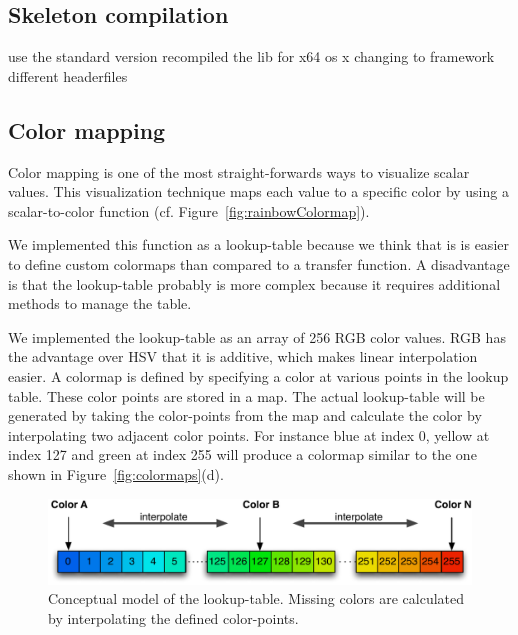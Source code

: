 \subsection{Skeleton compilation}
\label{sec:skeletonCompilation}

use the standard version
recompiled the lib for x64 os x 
changing to framework 
different headerfiles

\subsection{Color mapping}
\label{sec:colorMapping}
Color mapping is one of the most straight-forwards ways to visualize scalar values. This visualization technique maps each value to a specific color by using a scalar-to-color function (cf. Figure~\ref{fig:rainbowColormap}). 

We implemented this function as a lookup-table because we think that is is easier to define custom colormaps than compared to a transfer function. A disadvantage is that the lookup-table probably is more complex because it requires additional methods to manage the table.

We implemented the lookup-table as an array of 256 RGB color values. RGB has the advantage over HSV that it is additive, which makes linear interpolation easier. A colormap is defined by specifying a color at various points in the lookup table. These color points are stored in a map. The actual lookup-table will be generated by taking the color-points from the map and calculate the color by interpolating two adjacent color points. For instance blue at index 0, yellow at index 127 and green at index 255 will produce a colormap similar to the one shown in Figure~\ref{fig:colormaps}(d). 


\begin{figure}[htbp]
    \centering
    \includegraphics[width=.8\textwidth]{figures/colormaps/lookuptable.pdf}
    \caption{Conceptual model of the lookup-table. Missing colors are calculated by interpolating the defined color-points.}
    \label{fig:lookupTable}
\end{figure}

